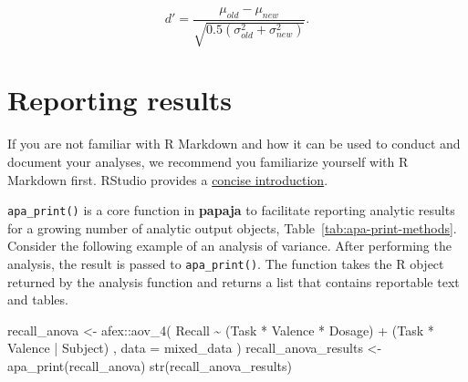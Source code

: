 \documentclass[
  ,man,floatsintext]{apa6}
\newenvironment{Shaded}{\begin{snugshade}}{\end{snugshade}}
\newcommand{\AttributeTok}[1]{\textcolor[rgb]{0.77,0.63,0.00}{#1}}
\newcommand{\FunctionTok}[1]{\textcolor[rgb]{0.00,0.00,0.00}{#1}}
\newcommand{\NormalTok}[1]{#1}
\newcommand{\OtherTok}[1]{\textcolor[rgb]{0.56,0.35,0.01}{#1}}
\newcommand{\SpecialCharTok}[1]{\textcolor[rgb]{0.00,0.00,0.00}{#1}}
\begin{document}
\[
d' = \frac{\mu_{old} - \mu_{new}}{\sqrt{0.5(\sigma^2_{old} + \sigma^2_{new})}}.
\]

\hypertarget{reporting-results}{%
\section{Reporting results}\label{reporting-results}}

If you are not familiar with R Markdown and how it can be used to conduct and document your analyses, we recommend you familiarize yourself with R Markdown first.
RStudio provides a \href{https://rmarkdown.rstudio.com/lesson-1.html}{concise introduction}.

\texttt{apa\_print()} is a core function in \textbf{papaja} to facilitate reporting analytic results for a growing number of analytic output objects, Table~\ref{tab:apa-print-methods}.
Consider the following example of an analysis of variance.
After performing the analysis, the result is passed to \texttt{apa\_print()}.
The function takes the R object returned by the analysis function and returns a list that contains reportable text and tables.

\begin{Shaded}
\begin{Highlighting}[]
\NormalTok{recall\_anova }\OtherTok{\textless{}{-}}\NormalTok{ afex}\SpecialCharTok{::}\FunctionTok{aov\_4}\NormalTok{(}
\NormalTok{  Recall }\SpecialCharTok{\textasciitilde{}}\NormalTok{ (Task }\SpecialCharTok{*}\NormalTok{ Valence }\SpecialCharTok{*}\NormalTok{ Dosage) }\SpecialCharTok{+}\NormalTok{ (Task }\SpecialCharTok{*}\NormalTok{ Valence }\SpecialCharTok{|}\NormalTok{ Subject)}
\NormalTok{  , }\AttributeTok{data =}\NormalTok{ mixed\_data}
\NormalTok{)}
\NormalTok{recall\_anova\_results }\OtherTok{\textless{}{-}} \FunctionTok{apa\_print}\NormalTok{(recall\_anova)}
\FunctionTok{str}\NormalTok{(recall\_anova\_results)}
\end{Highlighting}
\end{Shaded}
\end{document}
